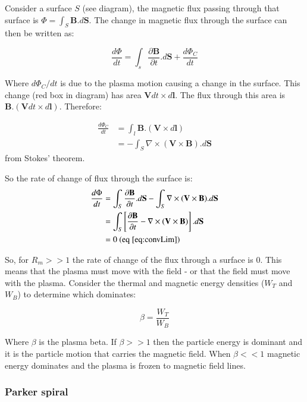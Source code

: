 \documentclass[12pt]{article}
\begin{document}
Consider a surface $S$ (see diagram), the magnetic flux passing through that surface is $\Phi=\int_S\textbf{B}.d\textbf{S}$. The change in magnetic flux through the surface can then be written as:

\begin{equation}
    \frac{d\Phi}{dt} = \int_s\frac{\partial\textbf{B}}{\partial t}.d\textbf{S} + \frac{d\Phi_C}{dt}
\end{equation}

Where $d\Phi_C/dt$ is due to the plasma motion causing a change in the surface.
This change (red box in diagram) has area $\textbf{V}dt\times d\textbf{l}$. The flux through this area is $\textbf{B}.(\textbf{V}dt\times d\textbf{l})$. Therefore:

\begin{align}
    \frac{d\Phi_C}{dt}&=\int_l\textbf{B}.(\textbf{V}\times d\textbf{l}) \nonumber\\
    &=-\int_S\nabla\times(\textbf{V}\times\textbf{B}).d\textbf{S}
\end{align}
from Stokes' theorem.

So the rate of change of flux through the surface is:
\begin{align}
    \frac{d\Phi}{dt}&=\int_S\frac{\partial\textbf{B}}{\partial t}.d\textbf{S}-\int_S\nabla\times(\textbf{V}\times\textbf{B}).d\textbf{S} \nonumber\\
    &= \int_S\left[\frac{\partial\textbf{B}}{\partial t}-\nabla\times(\textbf{V}\times\textbf{B})\right].d\textbf{S} \nonumber\\
    &= 0\text{ (eq \ref{eq:convLim})}
\end{align}

So, for $R_m >> 1$ the rate of change of the flux through a surface is 0. This means that the plasma must move with the field - or that the field must move with the plasma. Consider the thermal and magnetic energy densities ($W_T$ and $W_B$) to determine which dominates:

\begin{equation}
    \beta=\frac{W_T}{W_B}
\end{equation}

Where $\beta$ is the plasma beta. If $\beta>>1$ then the particle energy is dominant and it is the particle motion that carries the magnetic field. When $\beta<<1$ magnetic energy dominates and the plasma is frozen to magnetic field lines.

\subsubsection{Parker spiral}
\end{document}
